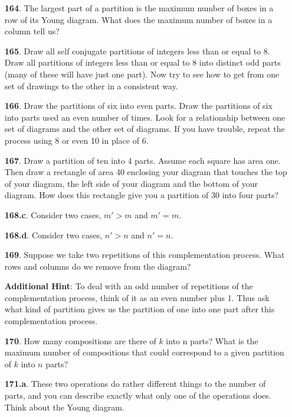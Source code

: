 \documentclass[10pt,]{book}
\theoremstyle{plain}
\theoremstyle{definition}
\theoremstyle{definition}
\numberwithin{equation}{chapter}
\newcommand{\gt}{>}
\begin{document}
\begin{itemize}[itemsep=1em]
\item[\textbf{164}.]The largest part of a partition is the maximum number of boxes in a row of its Young diagram. What does the maximum number of boxes in a column tell us?%

\item[\textbf{165}.]Draw all self conjugate partitions of integers less than or equal to 8.  Draw all partitions of integers less than or equal to 8 into distinct odd parts (many of these will have just one part). Now try to see how to get from one set of drawings to the other in a consistent way.%

\item[\textbf{166}.]Draw the partitions of six into even parts. Draw the partitions of six into parts used an even number of times. Look for a relationship between one set of diagrams and the other set of diagrams. If you have trouble, repeat the process using 8 or even 10 in place of 6.%

\item[\textbf{167}.]Draw a partition of ten into 4 parts. Assume each square has area one. Then draw a rectangle of area 40 enclosing your diagram that touches the top of your diagram, the left side of your diagram and the bottom of your diagram. How does this rectangle give you a partition of 30 into four parts?%

\item[\textbf{168.c}.]Consider two cases, \(m' \gt m\) and \(m' = m\).%

\item[\textbf{168.d}.]Consider two cases, \(n' \gt n\) and \(n' = n\).%

\item[\textbf{169}.]Suppose we take two repetitions of this complementation process. What rows and columns do we remove from the diagram?%

\par\smallskip
\noindent\textbf{Additional Hint}: To deal with an odd number of repetitions of the complementation process, think of it as an even number plus 1. Thus ask what kind of partition gives us the partition of one into one part after this complementation process.%

\item[\textbf{170}.]How many compositions are there of \(k\) into n parts? What is the maximum number of compositions that could correspond to a given partition of \(k\) into \(n\) parts?%

\item[\textbf{171.a}.]These two operations do rather different things to the number of parts, and you can describe exactly what only one of the operations does. Think about the Young diagram.%


\end{itemize}
\end{document}
